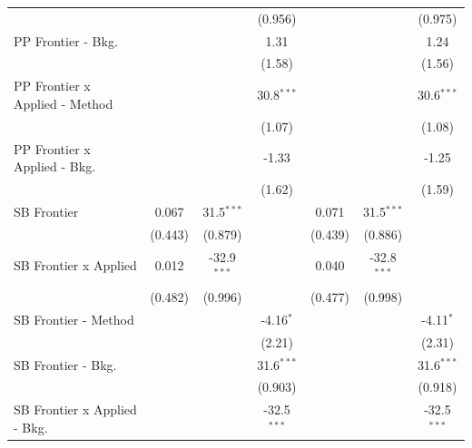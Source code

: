 \begin{tabular}{lcccccc}
                                  &                &               & (0.956)       &                &               & (0.975)\\   
   PP Frontier - Bkg.             &                &               & 1.31          &                &               & 1.24\\   
                                  &                &               & (1.58)        &                &               & (1.56)\\   
   PP Frontier x Applied - Method &                &               & 30.8$^{***}$  &                &               & 30.6$^{***}$\\   
                                  &                &               & (1.07)        &                &               & (1.08)\\   
   PP Frontier x Applied - Bkg.   &                &               & -1.33         &                &               & -1.25\\   
                                  &                &               & (1.62)        &                &               & (1.59)\\   
   SB Frontier                    & 0.067          & 31.5$^{***}$  &               & 0.071          & 31.5$^{***}$  &   \\   
                                  & (0.443)        & (0.879)       &               & (0.439)        & (0.886)       &   \\   
   SB Frontier x Applied          & 0.012          & -32.9$^{***}$ &               & 0.040          & -32.8$^{***}$ &   \\   
                                  & (0.482)        & (0.996)       &               & (0.477)        & (0.998)       &   \\   
   SB Frontier - Method           &                &               & -4.16$^{*}$   &                &               & -4.11$^{*}$\\   
                                  &                &               & (2.21)        &                &               & (2.31)\\   
   SB Frontier - Bkg.             &                &               & 31.6$^{***}$  &                &               & 31.6$^{***}$\\   
                                  &                &               & (0.903)       &                &               & (0.918)\\   
   SB Frontier x Applied - Bkg.   &                &               & -32.5$^{***}$ &                &               & -32.5$^{***}$\\   

\end{tabular}
